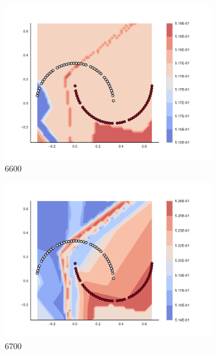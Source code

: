 \begin{figure}[h]
\begin{subfigure}[b]{0.09\textwidth}
    \includegraphics[clip, trim=2.35cm 1.75cm 4.5cm 0cm,width=\textwidth]{img/convergence/6600.pdf}
    \caption{6600}
    \label{fig:convergence_6600}
\end{subfigure}
%
\begin{subfigure}[b]{0.09\textwidth}
    \includegraphics[clip, trim=2.35cm 1.75cm 4.5cm 0cm,width=\textwidth]{img/convergence/6700.pdf}
    \caption{6700}
    \label{fig:convergence_6700}
\end{subfigure}
%
\begin{subfigure}[b]{0.09\textwidth}

\end{subfigure}
\end{figure}
